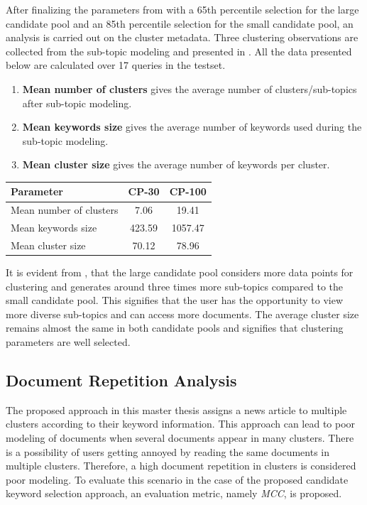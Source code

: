 After finalizing the parameters from  with a 65th percentile selection for the large candidate pool and an 85th percentile selection for the small candidate pool, an analysis is carried out on the cluster metadata. Three clustering observations are collected from the sub-topic modeling and presented in . All the data presented below are calculated over 17 queries in the testset.

\begin{enumerate}
	\item \textbf{Mean number of clusters} gives the average number of clusters/sub-topics after sub-topic modeling.
	\item \textbf{Mean keywords size} gives the average number of keywords used during the sub-topic modeling.
	\item \textbf{Mean cluster size} gives the average number of keywords per cluster.
\end{enumerate}

\begin{center}
	\label{tab:keyword_analysis}
	\begin{tabularx}{.6\textwidth}{|Y|c|c|}
		\hline
		Parameter & CP-30 & CP-100 \\
		\hline
		Mean number of clusters & 7.06 & 19.41 \\
		\hline
		Mean keywords size & 423.59 & 1057.47 \\
		\hline
		Mean cluster size & 70.12 & 78.96 \\
		\hline
	\end{tabularx}
\end{center}

It is evident from , that the large candidate pool considers more data points for clustering and generates around three times more sub-topics compared to the small candidate pool. This signifies that the user has the opportunity to view more diverse sub-topics and can access more documents. The average cluster size remains almost the same in both candidate pools and signifies that clustering parameters are well selected.

 \subsection{Document Repetition Analysis}
 
The proposed approach in this master thesis assigns a news article to multiple clusters according to their keyword information. This approach can lead to poor modeling of documents when several documents appear in many clusters. There is a possibility of users getting annoyed by reading the same documents in multiple clusters. Therefore, a high document repetition in clusters is considered poor modeling. To evaluate this scenario in the case of the proposed candidate keyword selection approach, an evaluation metric, namely \emph{\ac{MCC}}, is proposed. 

